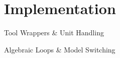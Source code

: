 
\section{Implementation}

\begin{frame}{Tool Wrappers \& Unit Handling}
\end{frame}

\begin{frame}{Algebraic Loops \& Model Switching}
\end{frame}
